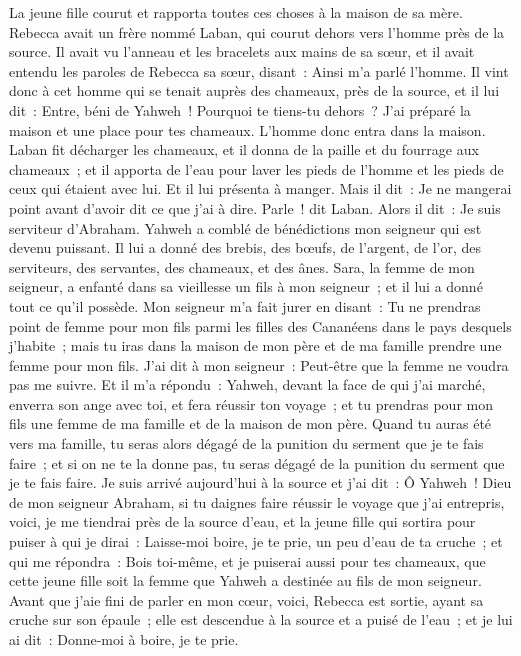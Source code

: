 \begin{multicols}{2}
La jeune fille courut et rapporta toutes ces choses à la maison de sa mère.
Rebecca avait un frère nommé Laban, qui courut dehors vers l'homme près de la source.
Il avait vu l'anneau et les bracelets aux mains de sa sœur, et il avait entendu les paroles de Rebecca sa sœur, disant~: Ainsi m'a parlé l'homme. Il vint donc à cet homme qui se tenait auprès des chameaux, près de la source,
et il lui dit~: Entre, béni de Yahweh~! Pourquoi te tiens-tu dehors~? J'ai préparé la maison et une place pour tes chameaux.
L'homme donc entra dans la maison. Laban fit décharger les chameaux, et il donna de la paille et du fourrage aux chameaux~; et il apporta de l'eau pour laver les pieds de l'homme et les pieds de ceux qui étaient avec lui.
Et il lui présenta à manger. Mais il dit~: Je ne mangerai point avant d'avoir dit ce que j'ai à dire. Parle~! dit Laban.
Alors il dit~: Je suis serviteur d'Abraham.
Yahweh a comblé de bénédictions mon seigneur qui est devenu puissant. Il lui a donné des brebis, des bœufs, de l'argent, de l'or, des serviteurs, des servantes, des chameaux, et des ânes.
Sara, la femme de mon seigneur, a enfanté dans sa vieillesse un fils à mon seigneur~; et il lui a donné tout ce qu'il possède.
Mon seigneur m'a fait jurer en disant~: Tu ne prendras point de femme pour mon fils parmi les filles des Cananéens dans le pays desquels j'habite~;
mais tu iras dans la maison de mon père et de ma famille prendre une femme pour mon fils.
J'ai dit à mon seigneur~: Peut-être que la femme ne voudra pas me suivre.
Et il m'a répondu~: Yahweh, devant la face de qui j'ai marché, enverra son ange avec toi, et fera réussir ton voyage~; et tu prendras pour mon fils une femme de ma famille et de la maison de mon père.
Quand tu auras été vers ma famille, tu seras alors dégagé de la punition du serment que je te fais faire~; et si on ne te la donne pas, tu seras dégagé de la punition du serment que je te fais faire.
Je suis arrivé aujourd'hui à la source et j'ai dit~: Ô Yahweh~! Dieu de mon seigneur Abraham, si tu daignes faire réussir le voyage que j'ai entrepris,
voici, je me tiendrai près de la source d'eau, et la jeune fille qui sortira pour puiser à qui je dirai~: Laisse-moi boire, je te prie, un peu d'eau de ta cruche~; et qui me répondra~:
Bois toi-même, et je puiserai aussi pour tes chameaux, que cette jeune fille soit la femme que Yahweh a destinée au fils de mon seigneur.
Avant que j'aie fini de parler en mon cœur, voici, Rebecca est sortie, ayant sa cruche sur son épaule~; elle est descendue à la source et a puisé de l'eau~; et je lui ai dit~: Donne-moi à boire, je te prie.

\end{multicols}

